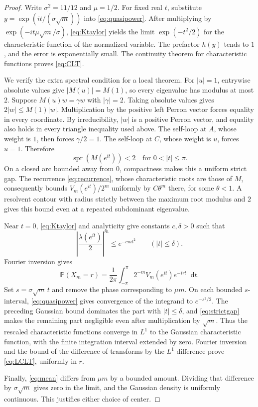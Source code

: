 \documentclass[11pt]{article}
\theoremstyle{definition}\newtheorem{definition}[theorem]{Definition}
\theoremstyle{remark}\newtheorem{remark}[theorem]{Remark}
\newcommand{\Prob}{\mathbb P}
\newcommand{\dd}{\mathop{}\!\mathrm d}
\begin{document}
\begin{proof}
Write $\sigma^2=11/12$ and $\mu=1/2$. For fixed real $t$, substitute
$y=\exp(it/(\sigma\sqrt m))$ into \eqref{eq:quasipower}. After multiplying
by $\exp(-it\mu\sqrt m/\sigma)$, \eqref{eq:Ktaylor} yields the limit
$\exp(-t^2/2)$ for the characteristic function of the normalized
variable. The prefactor $h(y)$ tends to $1$, and the error is
exponentially small. The continuity theorem for characteristic functions
proves \eqref{eq:CLT}.

We verify the extra spectral condition for a local theorem. For $|u|=1$,
entrywise absolute values give $|M(u)|=M(1)$, so every eigenvalue has
modulus at most $2$. Suppose $M(u)w=\gamma w$ with $|\gamma|=2$.
Taking absolute values gives $2|w|\leq M(1)|w|$. Multiplication by the
positive left Perron vector forces equality in every coordinate. By
irreducibility, $|w|$ is a positive Perron vector, and equality also
holds in every triangle inequality used above. The self-loop at $A$,
whose weight is $1$, then forces $\gamma/2=1$. The self-loop at $C$,
whose weight is $u$, forces $u=1$. Therefore
\begin{equation}\label{eq:strictgap}
 \operatorname{spr}(M(e^{it}))<2
 \quad\text{for }0<|t|\leq\pi.
\end{equation}
On a closed arc bounded away from $0$, compactness makes this a uniform
strict gap. The recurrence \eqref{eq:recurrence}, whose characteristic
roots are those of $M$, consequently bounds $V_m(e^{it})/2^m$
uniformly by $C\theta^m$ there, for some $\theta<1$. A resolvent contour
with radius strictly between the maximum root modulus and $2$ gives
this bound even at a repeated subdominant eigenvalue.

Near $t=0$, \eqref{eq:Ktaylor} and analyticity give constants $c,\delta>0$
such that
\[
 \left|\frac{\lambda(e^{it})}{2}\right|^m\leq e^{-cm t^2}
 \qquad(|t|\leq\delta).
\]
Fourier inversion gives
\[
 \Prob(X_m=r)=\frac1{2\pi}\int_{-\pi}^{\pi}
                 2^{-m}V_m(e^{it})e^{-irt}\dd t.
\]
Set $s=\sigma\sqrt m\,t$ and remove the phase corresponding to $\mu m$.
On each bounded $s$-interval, \eqref{eq:quasipower} gives convergence of
the integrand to $e^{-s^2/2}$. The preceding Gaussian bound dominates the
part with $|t|\leq\delta$, and \eqref{eq:strictgap} makes the remaining
part negligible even after multiplication by $\sqrt m$. Thus the
rescaled characteristic functions converge in $L^1$ to the Gaussian
characteristic function, with the finite integration interval extended
by zero. Fourier inversion and the bound of the difference of transforms
by the $L^1$ difference prove \eqref{eq:LCLT}, uniformly in $r$.

Finally, \eqref{eq:mean} differs from $\mu m$ by a bounded amount. Dividing
that difference by $\sigma\sqrt m$ gives zero in the limit, and the
Gaussian density is uniformly continuous. This justifies either choice
of center.
\end{proof}
\end{document}
